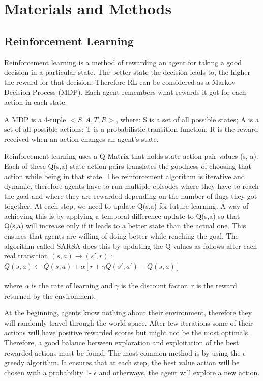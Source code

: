 \documentclass[letterpaper]{article}
\begin{document}
\section{Materials and Methods}
\subsection{Reinforcement Learning}
Reinforcement learning is a method of rewarding an agent for taking a good decision in a particular state. The better state the decision leads to, the higher the reward for that decision. Therefore RL can be considered as a Markov Decision Process (MDP). Each agent remembers what rewards it got for each action in each state. 

A MDP is a 4-tuple $< S, A, T, R >$, where: S is a set of all possible states; A is a set of all possible actions; T is a probabilistic transition function; R is the reward received when an action changes an agent's state.

Reinforcement learning uses a Q-Matrix that holds state-action pair values (s, a). Each of these Q(s,a) state-action pairs translates the goodness of choosing that action while being in that state. The reinforcement algorithm is iterative and dynamic, therefore agents have to run multiple episodes where they have to reach the goal and where they are rewarded depending on the number of flags they got together. At each step, we need to update Q(s,a)  for future learning. A way of achieving this is by applying a temporal-difference update to Q(s,a) so that Q(s,a) will increase only if it leads to a better state than the actual one. This ensures that agents are willing of doing better while reaching the goal. The algorithm called SARSA does this by updating the Q-values as follows after each real transition $(s, a)  \rightarrow  (s', r)$ : \\

$Q(s, a) \leftarrow  Q(s, a) +  \alpha [r + \gamma Q(s', a') - Q(s,a)]$\\\\
where $\alpha$ is the rate of learning and $\gamma$ is the discount factor. r is the reward returned by the environment.

At the beginning, agents know nothing about their environment, therefore they will randomly travel through the world space. After few iterations some of their actions will have positive rewarded scores but might not be the most optimals. Therefore, a good balance between exploration and exploitation of the best rewarded actions must be found. The most common method is by using the $\epsilon$-greedy algorithm. It ensures that at each step, the best value action will be chosen with a probability 1- $\epsilon$ and otherways, the agent will explore a new action.
\end{document}
